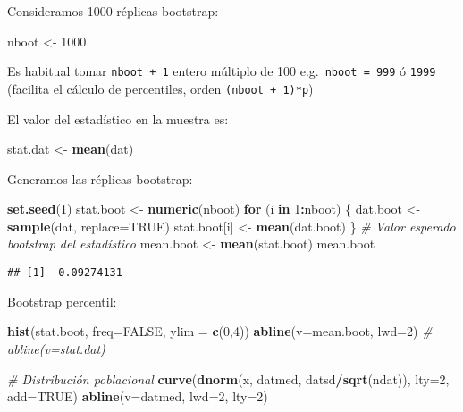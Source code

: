 \documentclass[
]{book}
\newenvironment{Shaded}{\begin{snugshade}}{\end{snugshade}}
\newcommand{\CommentTok}[1]{\textcolor[rgb]{0.56,0.35,0.01}{\textit{#1}}}
\newcommand{\ControlFlowTok}[1]{\textcolor[rgb]{0.13,0.29,0.53}{\textbf{#1}}}
\newcommand{\DataTypeTok}[1]{\textcolor[rgb]{0.13,0.29,0.53}{#1}}
\newcommand{\DecValTok}[1]{\textcolor[rgb]{0.00,0.00,0.81}{#1}}
\newcommand{\KeywordTok}[1]{\textcolor[rgb]{0.13,0.29,0.53}{\textbf{#1}}}
\newcommand{\NormalTok}[1]{#1}
\newcommand{\OperatorTok}[1]{\textcolor[rgb]{0.81,0.36,0.00}{\textbf{#1}}}
\newcommand{\OtherTok}[1]{\textcolor[rgb]{0.56,0.35,0.01}{#1}}
\newcommand{\StringTok}[1]{\textcolor[rgb]{0.31,0.60,0.02}{#1}}
\theoremstyle{break}
\theoremstyle{definition}
\theoremstyle{definition}
\theoremstyle{definition}
\theoremstyle{remark}
\begin{document}
Consideramos 1000 réplicas bootstrap:

\begin{Shaded}
\begin{Highlighting}[]
\NormalTok{nboot <-}\StringTok{ }\DecValTok{1000}  
\end{Highlighting}
\end{Shaded}

Es habitual tomar \texttt{nboot\ +\ 1} entero múltiplo de 100 e.g.~\texttt{nboot\ =\ 999} ó \texttt{1999}
(facilita el cálculo de percentiles, orden \texttt{(nboot\ +\ 1)*p})

El valor del estadístico en la muestra es:

\begin{Shaded}
\begin{Highlighting}[]
\NormalTok{stat.dat <-}\StringTok{ }\KeywordTok{mean}\NormalTok{(dat)}
\end{Highlighting}
\end{Shaded}

Generamos las réplicas bootstrap:

\begin{Shaded}
\begin{Highlighting}[]
\KeywordTok{set.seed}\NormalTok{(}\DecValTok{1}\NormalTok{)}
\NormalTok{stat.boot <-}\StringTok{ }\KeywordTok{numeric}\NormalTok{(nboot)}
\ControlFlowTok{for}\NormalTok{ (i }\ControlFlowTok{in} \DecValTok{1}\OperatorTok{:}\NormalTok{nboot) \{}
\NormalTok{  dat.boot <-}\StringTok{ }\KeywordTok{sample}\NormalTok{(dat, }\DataTypeTok{replace=}\OtherTok{TRUE}\NormalTok{)}
\NormalTok{  stat.boot[i] <-}\StringTok{ }\KeywordTok{mean}\NormalTok{(dat.boot)}
\NormalTok{\}}
\CommentTok{# Valor esperado bootstrap del estadístico}
\NormalTok{mean.boot <-}\StringTok{ }\KeywordTok{mean}\NormalTok{(stat.boot)  }
\NormalTok{mean.boot}
\end{Highlighting}
\end{Shaded}

\begin{verbatim}
## [1] -0.09274131
\end{verbatim}

Bootstrap percentil:

\begin{Shaded}
\begin{Highlighting}[]
\KeywordTok{hist}\NormalTok{(stat.boot, }\DataTypeTok{freq=}\OtherTok{FALSE}\NormalTok{, }\DataTypeTok{ylim =} \KeywordTok{c}\NormalTok{(}\DecValTok{0}\NormalTok{,}\DecValTok{4}\NormalTok{))}
\KeywordTok{abline}\NormalTok{(}\DataTypeTok{v=}\NormalTok{mean.boot, }\DataTypeTok{lwd=}\DecValTok{2}\NormalTok{)}
\CommentTok{# abline(v=stat.dat)}

\CommentTok{# Distribución poblacional}
\KeywordTok{curve}\NormalTok{(}\KeywordTok{dnorm}\NormalTok{(x, datmed, datsd}\OperatorTok{/}\KeywordTok{sqrt}\NormalTok{(ndat)), }\DataTypeTok{lty=}\DecValTok{2}\NormalTok{, }\DataTypeTok{add=}\OtherTok{TRUE}\NormalTok{)}
\KeywordTok{abline}\NormalTok{(}\DataTypeTok{v=}\NormalTok{datmed, }\DataTypeTok{lwd=}\DecValTok{2}\NormalTok{, }\DataTypeTok{lty=}\DecValTok{2}\NormalTok{)}
\end{Highlighting}
\end{Shaded}
\end{document}
